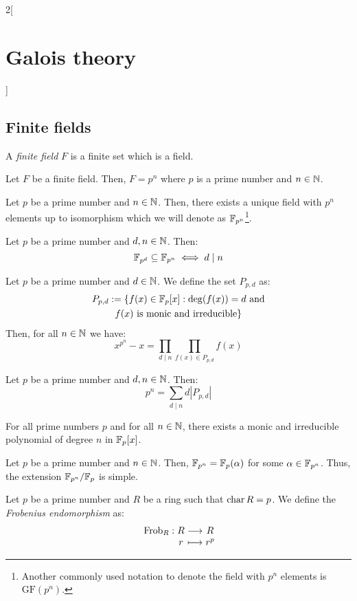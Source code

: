 \documentclass[../../../main.tex]{subfiles}
\begin{document}
\begin{multicols}{2}[\section{Galois theory}]
  \subsection{Finite fields}
  \begin{definition}
    A \textit{finite field} $F$ is a finite set which is a field.
  \end{definition}
  \begin{prop}
    Let $F$ be a finite field. Then, $F=p^n$ where $p$ is a prime number and $n\in\mathbb{N}$.
  \end{prop}
  \begin{theorem}
    Let $p$ be a prime number and $n\in\mathbb{N}$. Then, there exists a unique field with $p^n$ elements up to isomorphism which we will denote as $\mathbb{F}_{p^n}$\footnote{Another commonly used notation to denote the field with $p^n$ elements is $\text{GF}(p^n)$.}.
  \end{theorem}
  \begin{prop}
    Let $p$ be a prime number and $d,n\in\mathbb{N}$. Then: $$\mathbb{F}_{p^d}\subseteq\mathbb{F}_{p^n}\iff d\mid n$$
  \end{prop}
  \begin{theorem}
    Let $p$ be a prime number and $d\in\mathbb{N}$. We define the set $P_{p,d}$ as:
    \begin{multline*}
      P_{p,d}:=\{f(x)\in\mathbb{F}_p[x]:\deg(f(x))=d\text{ and}\\\text{$f(x)$ is monic and irreducible}\}
    \end{multline*}
    Then, for all $n\in\mathbb{N}$ we have: $$x^{p^n}-x=\prod_{d\mid n}\prod_{f(x)\in P_{p,d}}f(x)$$
  \end{theorem}
  \begin{corollary}
    Let $p$ be a prime number and $d,n\in\mathbb{N}$. Then: $$p^n=\sum_{d\mid n}d|P_{p,d}|$$
  \end{corollary}
  \begin{corollary}
    For all prime numbers $p$ and for all $n\in\mathbb{N}$, there exists a monic and irreducible polynomial of degree $n$ in $\mathbb{F}_p[x]$.
  \end{corollary}
  \begin{corollary}
    Let $p$ be a prime number and $n\in\mathbb{N}$. Then, $\mathbb{F}_{p^n}=\mathbb{F}_p(\alpha)$ for some $\alpha\in\mathbb{F}_{p^n}$. Thus, the extension $\quot{\FF_{p^n}}{\FF_p}$ is simple.
  \end{corollary}
  \begin{definition}
    Let $p$ be a prime number and $R$ be a ring such that $\operatorname{char} R=p$. We define the \textit{Frobenius endomorphism} as: $$\function{\text{Frob}_R}{R}{R}{r}{r^p}$$

\end{definition}
\end{multicols}
\end{document}
